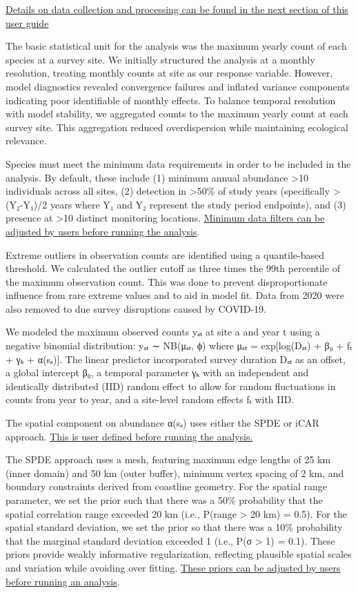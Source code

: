 \documentclass[
  letterpaper,
  DIV=11,
  numbers=noendperiod]{scrreprt}
\begin{document}
\hyperref[2.1Data]{Details on data collection and processing can be
found in the next section of this user guide}

The basic statistical unit for the analysis was the maximum yearly count
of each species at a survey site. We initially structured the analysis
at a monthly resolution, treating monthly counts at site as our response
variable. However, model diagnostics revealed convergence failures and
inflated variance components indicating poor identifiable of monthly
effects. To balance temporal resolution with model stability, we
aggregated counts to the maximum yearly count at each survey site. This
aggregation reduced overdispersion while maintaining ecological
relevance.

Species must meet the minimum data requirements in order to be included
in the analysis. By default, these include (1) minimum annual abundance
\textgreater10 individuals across all sites, (2) detection in
\textgreater50\% of study years (specifically \textgreater(Y₂-Y₁)/2
years where Y₁ and Y₂ represent the study period endpoints), and (3)
presence at \textgreater10 distinct monitoring locations.
\hyperref[3.1Analysis]{Minimum data filters can be adjusted by users
before running the analysis}.

Extreme outliers in observation counts are identified using a
quantile-based threshold. We calculated the outlier cutoff as three
times the 99th percentile of the maximum observation count. This was
done to prevent disproportionate influence from rare extreme values and
to aid in model fit. Data from 2020 were also removed to due survey
disruptions caused by COVID-19.

We modeled the maximum observed counts yₐₜ at site a and year t using a
negative binomial distribution: yₐₜ ∼ NB(μₐₜ, ϕ) where μₐₜ =
exp{[}log(Dₐₜ) + β₀ + fₜ + γₖ + α(sₐ){]}. The linear predictor
incorporated survey duration Dₐₜ as an offset, a global intercept β₀, a
temporal parameter γₖ with an independent and identically distributed
(IID) random effect to allow for random fluctuations in counts from year
to year, and a site-level random effects fₜ with IID.

The spatial component on abundance α(sₐ) uses either the SPDE or iCAR
approach. \hyperref[3.1Analysis]{This is user defined before running the
analysis.}

The SPDE approach uses a mesh, featuring maximum edge lengths of 25 km
(inner domain) and 50 km (outer buffer), minimum vertex spacing of 2 km,
and boundary constraints derived from coastline geometry. For the
spatial range parameter, we set the prior such that there was a 50\%
probability that the spatial correlation range exceeded 20 km (i.e.,
P(range \textgreater{} 20 km) = 0.5). For the spatial standard
deviation, we set the prior so that there was a 10\% probability that
the marginal standard deviation exceeded 1 (i.e., P(σ \textgreater{} 1)
= 0.1). These priors provide weakly informative regularization,
reflecting plausible spatial scales and variation while avoiding over
fitting. \hyperref[3.1SPDE]{These priors can be adjusted by users before
running an analysis}.
\end{document}
